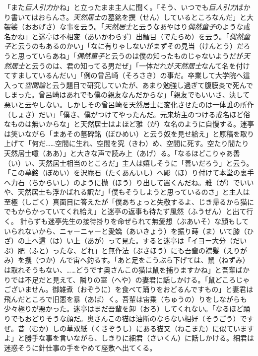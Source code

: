 \documentclass{book}
\begin{document}
「また\emph{巨人引力}かね」と立ったまま主人に聞く。「そう、いつでも\emph{巨人引力}ばかり書いてはおらんさ。\emph{天然居士}の墓銘を撰（せん）しているところなんだ」と大袈裟（おおげさ）な事を云う。「\emph{天然居士}と云うなあやはり\emph{偶然童子}のような戒名かね」と迷亭は不相変（あいかわらず）出鱈目（でたらめ）を云う。「\emph{偶然童子}と云うのもあるのかい」「なに有りゃしないがまずその見当（けんとう）だろうと思っていらあね」「\emph{偶然童子}と云うのは僕の知ったものじゃないようだが\emph{天然居士}と云うのは、君の知ってる男だぜ」「一体だれが\emph{天然居士}なんて名を付けてすましているんだい」「例の曾呂崎（そろさき）の事だ。卒業して大学院へ這入って\emph{空間論}と云う題目で研究していたが、あまり勉強し過ぎて腹膜炎で死んでしまった。曾呂崎はあれでも僕の親友なんだからな」「親友でもいいさ、決して悪いと云やしない。しかしその曾呂崎を天然居士に変化させたのは一体誰の所作（しょさ）だい」「僕さ、僕がつけてやったんだ。元来坊主のつける戒名ほど俗なものは無いからな」と天然居士はよほど雅（が）な名のように自慢する。迷亭は笑いながら「まあその墓碑銘（ぼひめい）と云う奴を見せ給え」と原稿を取り上げて「何だ\ldots{}\ldots{}空間に生れ、空間を究（きわ）め、空間に死す。空たり間たり天然居士噫（ああ）」と大きな声で読み上（あげ）る。「なるほどこりゃあ善（い）い、天然居士相当のところだ」主人は嬉しそうに「善いだろう」と云う。「この墓銘（ぼめい）を沢庵石（たくあんいし）へ彫（ほ）り付けて本堂の裏手へ力石（ちからいし）のように抛（ほう）り出して置くんだね。雅（が）でいいや、天然居士も浮かばれる訳だ」「僕もそうしようと思っているのさ」と主人は至極（しごく）真面目に答えたが「僕あちょっと失敬するよ、じき帰るから猫にでもからかっていてくれ給え」と迷亭の返事も待たず風然（ふうぜん）と出て行く。
計らずも迷亭先生の接待掛りを命ぜられて無愛想（ぶあいそ）な顔もしていられないから、ニャーニャーと愛嬌（あいきょう）を振り蒔（ま）いて膝（ひざ）の上へ這（は）い上（あが）って見た。すると迷亭は「イヨー大分（だいぶ）肥（ふと）ったな、どれ」と無作法（ぶさほう）にも吾輩の襟髪（えりがみ）を攫（つか）んで宙へ釣るす。「あと足をこうぶら下げては、鼠（ねずみ）は取れそうもない、\ldots{}\ldots{}どうです奥さんこの猫は鼠を捕りますかね」と吾輩ばかりでは不足だと見えて、隣りの室（へや）の妻君に話しかける。「鼠どころじゃございません。御雑煮（おぞうに）を食べて踊りをおどるんですもの」と妻君は飛んだところで旧悪を暴（あば）く。吾輩は宙乗（ちゅうの）りをしながらも少々極りが悪かった。迷亭はまだ吾輩を卸（おろ）してくれない。「なるほど踊りでもおどりそうな顔だ。奥さんこの猫は油断のならない相好（そうごう）ですぜ。昔（むか）しの草双紙（くさぞうし）にある猫又（ねこまた）に似ていますよ」と勝手な事を言いながら、しきりに細君（さいくん）に話しかける。細君は迷惑そうに針仕事の手をやめて座敷へ出てくる。
\end{document}
